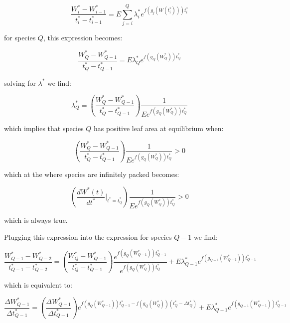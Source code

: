 \documentclass[11pt]{article}
\begin{document}
\begin{equation*}
  \frac{W_{i}^{*} - W_{i-1}^{*}}{t_{i}^{*}-t_{i-1}^{*}} = E \sum_{j=i}^{Q} \lambda_{i}^{*}e^{f(g_{j}(W(t_{i}^{*}))) t_{i}^{*}}
\end{equation*}

for species \(Q\), this expression becomes:

\begin{equation*}
  \frac{W_{Q}^{*} - W_{Q-1}^{*}}{t_{Q}^{*}-t_{Q-1}^{*}} = E \lambda_{Q}^{*}e^{f(g_{Q}(W_{Q}^{*})) t_{Q}^{*}}
\end{equation*}

solving for \(\lambda^{*}\) we find:

\begin{equation*}
  \lambda_{Q}^{*} = \left(\frac{W_{Q}^{*} - W_{Q-1}^{*}}{t_{Q}^{*}-t_{Q-1}^{*}}\right) \frac{1}{E e^{f(g_{Q}(W_{Q}^{*})) t_{Q}^{*}}}
\end{equation*}

which implies that species \(Q\) has positive leaf area at equilibrium when:

\begin{equation*}
  \left(\frac{W_{Q}^{*} - W_{Q-1}^{*}}{t_{Q}^{*}-t_{Q-1}^{*}}\right) \frac{1}{E e^{f(g_{Q}(W_{Q}^{*})) t_{Q}^{*}}} > 0
\end{equation*}

which at the where species are infinitely packed becomes:

\begin{equation*}
  \left(\frac{dW^{*}(t)}{dt^{*}}|_{t^{*} = t_{Q}^{*}}\right) \frac{1}{E e^{f(g_{Q}(W_{Q}^{*})) t_{Q}^{*}}} > 0
\end{equation*}

which is always true.

Plugging this expression into the expression for species \(Q-1\) we find:

\begin{equation*}
  \frac{W_{Q-1}^{*} - W_{Q-2}^{*}}{t_{Q-1}^{*}-t_{Q-2}^{*}} = \left(\frac{W_{Q}^{*} - W_{Q-1}^{*}}{t_{Q}^{*}-t_{Q-1}^{*}}\right) \frac{e^{f(g_{Q}(W_{Q-1}^{*})) t_{Q-1}^{*}}}{e^{f(g_{Q}(W_{Q}^{*})) t_{Q}^{*}}} + E \lambda_{Q-1}^{*}e^{f(g_{Q-1}(W_{Q-1}^{*})) t_{Q-1}^{*}}
\end{equation*}

which is equivalent to:

\begin{equation*}
  \frac{\Delta W_{Q-1}^{*}}{\Delta t_{Q-1}^{*}} = \left(\frac{\Delta W_{Q-1}^{*}}{\Delta t_{Q-1}^{*}}\right) e^{f(g_{Q}(W_{Q-1}^{*})) t_{Q-1}^{*} - f(g_{Q}(W_{Q}^{*})) (t_{Q}^{*} - \Delta t_{Q}^{*})} + E \lambda_{Q-1}^{*}e^{f(g_{Q-1}(W_{Q-1}^{*})) t_{Q-1}^{*}}
\end{equation*}
\end{document}
